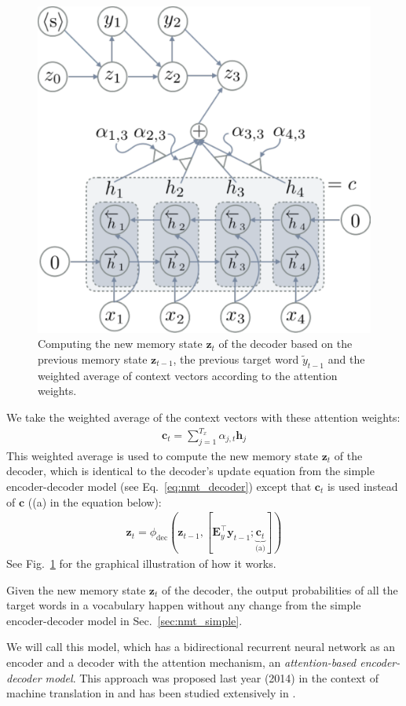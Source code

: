\documentclass{report}
\newcommand{\vect}[1]{\mathbf{#1}}
\newcommand{\matr}[1]{\mathbf{#1}}
\newcommand{\vc}[0]{\vect{c}}
\newcommand{\vh}[0]{\vect{h}}
\newcommand{\vz}[0]{\vect{z}}
\newcommand{\vy}[0]{\vect{y}}
\newcommand{\mE}[0]{\matr{E}}
\newcommand{\dec}{\text{dec}}
\begin{document}
\begin{figure}[t]
    \centering
    \centering
    \includegraphics[width=0.7\columnwidth]{figures/nmt_att_dec.pdf}

    \caption{Computing the new memory state $\vz_t$ of the decoder based on the
        previous memory state $\vz_{t-1}$, the previous target word
    $\tilde{y}_{t-1}$ and the weighted average of context vectors according to
the attention weights.}
    \label{fig:att2}
\end{figure}

We take the weighted average of the context vectors with these attention
weights:
\begin{align}
    \label{eq:td_context}
    \vc_t = \sum_{j=1}^{T_x} \alpha_{j, t} \vh_j
\end{align}
This weighted average is used to compute the new memory state $\vz_t$ of the
decoder, which is identical to the decoder's update equation from the simple
encoder-decoder model (see Eq.~\eqref{eq:nmt_decoder}) except that $\vc_t$ is
used instead of $\vc$ ((a) in the equation below):
\begin{align*}
    \vz_t = \phi_{\dec}\left( \vz_{t-1}, \left[ \mE_y^\top \vy_{t-1};
            \underbrace{\vc_t}_{\text{(a)}}
    \right]\right)
\end{align*}
See Fig.~\ref{fig:att2} for the graphical illustration of how it works.

Given the new memory state $\vz_t$ of the decoder, the output probabilities of
all the target words in a vocabulary happen without any change from the simple
encoder-decoder model in Sec.~\ref{sec:nmt_simple}.

We will call this model, which has a bidirectional recurrent neural network as
an encoder and a decoder with the attention mechanism, an {\em attention-based
encoder-decoder model}. This approach was proposed last year (2014) in the
context of machine translation in \cite{bahdanau2014neural} and has been studied
extensively in \cite{luong2015effective}.
\end{document}
